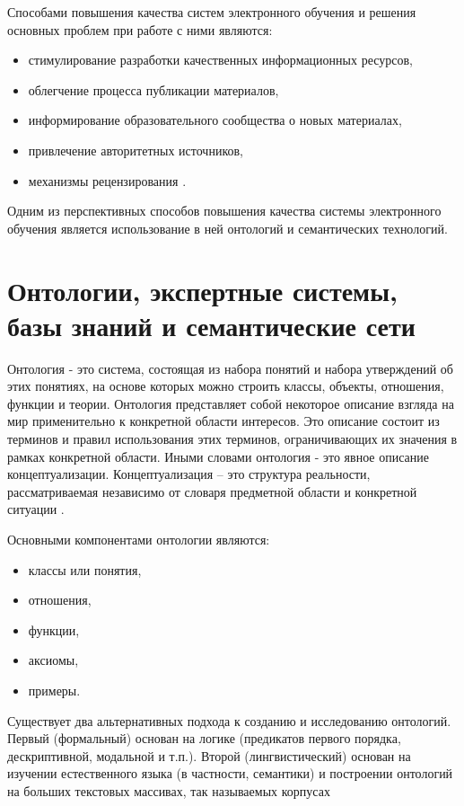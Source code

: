 Способами повышения качества систем электронного обучения и решения основных проблем при работе с ними являются: 

\begin{itemize}
\item стимулирование разработки качественных информационных ресурсов,
\item облегчение процесса публикации материалов, 
\item информирование образовательного сообщества о новых материалах,
\item привлечение авторитетных источников, 
\item механизмы рецензирования \cite{ivannicov2003common}.
\end{itemize}

Одним из перспективных способов повышения качества системы электронного обучения является использование в ней онтологий и семантических технологий.



\section{Онтологии, экспертные системы, базы знаний и семантические сети} \label{sect1_3}

Онтология - это система, состоящая из набора понятий и набора утверждений об этих понятиях, на основе которых можно строить классы, объекты, отношения, функции и теории. Онтология представляет собой некоторое описание взгляда на мир применительно к конкретной области интересов. Это описание состоит из терминов и правил использования этих терминов, ограничивающих их значения в рамках конкретной области. Иными словами онтология - это явное описание концептуализации. Концептуализация – это структура реальности, рассматриваемая
независимо от словаря предметной области и конкретной ситуации \cite{solov2006ontology}. 

Основными компонентами онтологии являются:

\begin{itemize}
\item классы или понятия,
\item отношения,
\item функции,
\item аксиомы,
\item примеры.
\end{itemize}

Существует два альтернативных подхода к созданию и исследованию онтологий. Первый (формальный) основан на логике (предикатов первого порядка, дескриптивной, модальной и т.п.). Второй (лингвистический) основан на изучении естественного языка (в частности, семантики) и построении онтологий на больших текстовых массивах, так называемых корпусах


